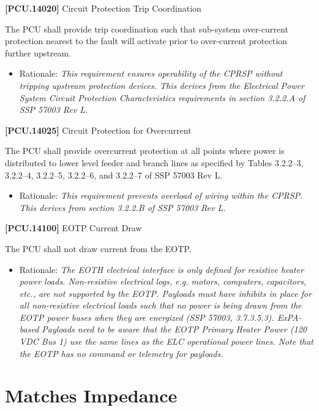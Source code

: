 \textbf{[PCU.14020]} Circuit Protection Trip Coordination

The \gls{PCU} shall provide trip coordination such that sub-system over-current protection nearest to the fault will activate prior to over-current protection further upstream.

\begin{itemize}
\item{} Rationale: \emph{This requirement ensures operability of the CPRSP without tripping upstream protection devices. This derives from the Electrical Power System Circuit Protection Characteristics requirements in section 3.2.2.A of SSP 57003 Rev L.}

\end{itemize}

\textbf{[PCU.14025]} Circuit Protection for Overcurrent

The \gls{PCU} shall provide overcurrent protection at all points where power is distributed to lower level feeder and branch lines as specified by Tables 3.2.2--3, 3.2.2--4, 3.2.2--5, 3.2.2--6, and 3.2.2--7 of SSP 57003 Rev L.

\begin{itemize}
\item{} Rationale: \emph{This requirement prevents overload of wiring within the CPRSP. This derives from section 3.2.2.B of SSP 57003 Rev L.}

\end{itemize}

\textbf{[PCU.14100]} \gls{EOTP} Current Draw

The \gls{PCU} shall not draw current from the \gls{EOTP}.

\begin{itemize}
\item{} Rationale: \emph{The EOTH electrical interface is only defined for resistive heater power loads. Non-resistive electrical logs, \emph{e.g.} motors, computers, capacitors, \emph{etc.}, are not supported by the EOTP. Payloads must have inhibits in place for all non-resistive electrical loads such that no power is being drawn from the EOTP power buses when they are energized (SSP 57003, 3.7.3.5.3). ExPA-based Payloads need to be aware that the EOTP Primary Heater Power (120 VDC Bus 1) use the same lines as the ELC operational power lines. Note that the EOTP has no command or telemetry for payloads.}

\end{itemize}

\section{Matches Impedance}
\label{matchesimpedance}

